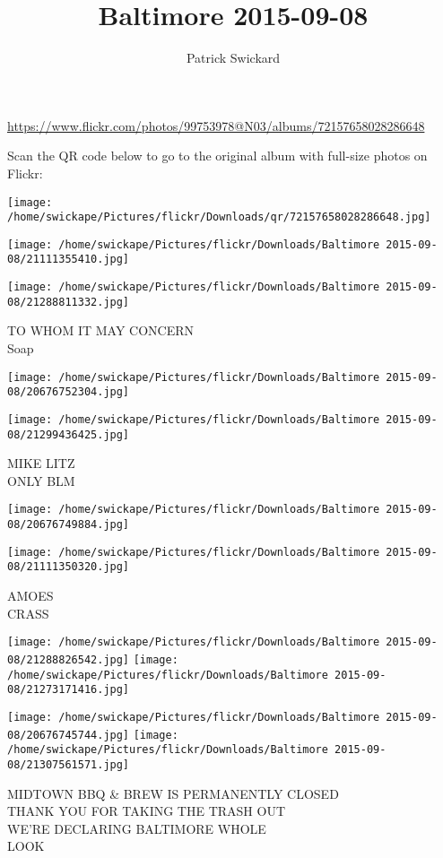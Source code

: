 \documentclass[10pt,letterpaper]{article}
\title{Baltimore 2015-09-08}
\author{Patrick Swickard}
\date{}
\begin{document}
\maketitle

\url{https://www.flickr.com/photos/99753978@N03/albums/72157658028286648}

Scan the QR code below to go to the original album with full-size photos on Flickr:

\texttt{[image: /home/swickape/Pictures/flickr/Downloads/qr/72157658028286648.jpg]}
\pagebreak

\texttt{[image: /home/swickape/Pictures/flickr/Downloads/Baltimore 2015-09-08/21111355410.jpg]}

\vspace{0.25in}
\texttt{[image: /home/swickape/Pictures/flickr/Downloads/Baltimore 2015-09-08/21288811332.jpg]}

TO WHOM IT MAY CONCERN\\
Soap
\pagebreak

\texttt{[image: /home/swickape/Pictures/flickr/Downloads/Baltimore 2015-09-08/20676752304.jpg]}

\vspace{0.25in}
\texttt{[image: /home/swickape/Pictures/flickr/Downloads/Baltimore 2015-09-08/21299436425.jpg]}

MIKE LITZ\\
ONLY BLM
\pagebreak

\texttt{[image: /home/swickape/Pictures/flickr/Downloads/Baltimore 2015-09-08/20676749884.jpg]}

\vspace{0.25in}
\texttt{[image: /home/swickape/Pictures/flickr/Downloads/Baltimore 2015-09-08/21111350320.jpg]}

AMOES\\
CRASS
\pagebreak

\texttt{[image: /home/swickape/Pictures/flickr/Downloads/Baltimore 2015-09-08/21288826542.jpg]}
\texttt{[image: /home/swickape/Pictures/flickr/Downloads/Baltimore 2015-09-08/21273171416.jpg]}

\texttt{[image: /home/swickape/Pictures/flickr/Downloads/Baltimore 2015-09-08/20676745744.jpg]}
\texttt{[image: /home/swickape/Pictures/flickr/Downloads/Baltimore 2015-09-08/21307561571.jpg]}

MIDTOWN BBQ \& BREW IS PERMANENTLY CLOSED\\
THANK YOU FOR TAKING THE TRASH OUT\\
WE'RE DECLARING BALTIMORE WHOLE\\
LOOK
\pagebreak
\end{document}
